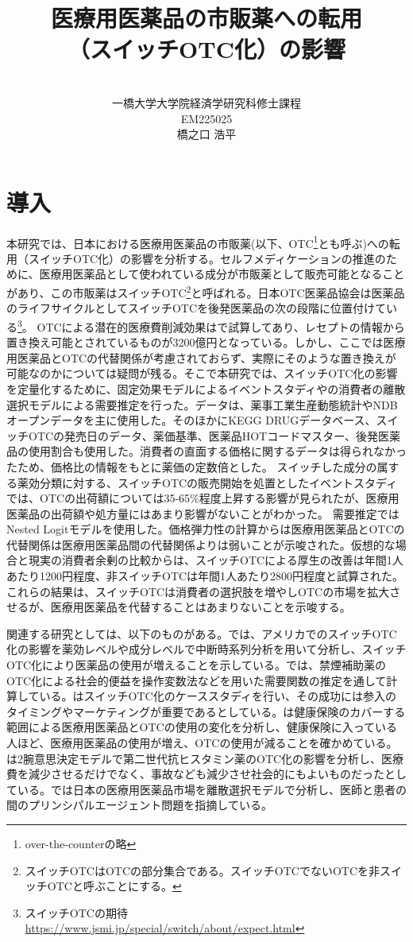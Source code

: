 \documentclass[a4paper,11pt,uplatex]{jsarticle}
\title{\huge 医療用医薬品の市販薬への転用\\（スイッチOTC化）の影響}
\author{\vspace{14cm}\\
一橋大学大学院経済学研究科修士課程\\
EM225025\\
橋之口 浩平}
\date{}
\theoremstyle{definition}
\begin{document}
\thispagestyle{empty}
\maketitle{}
\setcounter{page}{1}
\section{導入}
本研究では、日本における医療用医薬品の市販薬(以下、OTC\footnote{over-the-counterの略}とも呼ぶ)への転用（スイッチOTC化）の影響を分析する。セルフメディケーションの推進のために、医療用医薬品として使われている成分が市販薬として販売可能となることがあり、この市販薬はスイッチOTC\footnote{スイッチOTCはOTCの部分集合である。スイッチOTCでないOTCを非スイッチOTCと呼ぶことにする。}と呼ばれる。日本OTC医薬品協会は医薬品のライフサイクルとしてスイッチOTCを後発医薬品の次の段階に位置付けている\footnote{スイッチOTCの期待\url{https://www.jsmi.jp/special/switch/about/expect.html}}。
OTCによる潜在的医療費削減効果は\cite{igarashi2021}で試算してあり、レセプトの情報から置き換え可能とされているものが3200億円となっている。しかし、ここでは医療用医薬品とOTCの代替関係が考慮されておらず、実際にそのような置き換えが可能なのかについては疑問が残る。そこで本研究では、スイッチOTC化の影響を定量化するために、固定効果モデルによるイベントスタディや\cite{Berry1994}の消費者の離散選択モデルによる需要推定を行った。データは、薬事工業生産動態統計やNDBオープンデータを主に使用した。そのほかにKEGG DRUGデータベース、スイッチOTCの発売日のデータ、薬価基準、医薬品HOTコードマスター、後発医薬品の使用割合も使用した。消費者の直面する価格に関するデータは得られなかったため、価格比の情報をもとに薬価の定数倍とした。
スイッチした成分の属する薬効分類に対する、スイッチOTCの販売開始を処置としたイベントスタディでは、OTCの出荷額については35-65\%程度上昇する影響が見られたが、医療用医薬品の出荷額や処方量にはあまり影響がないことがわかった。
需要推定ではNested Logitモデルを使用した。価格弾力性の計算からは医療用医薬品とOTCの代替関係は医療用医薬品間の代替関係よりは弱いことが示唆された。仮想的な場合と現実の消費者余剰の比較からは、スイッチOTCによる厚生の改善は年間1人あたり1200円程度、非スイッチOTCは年間1人あたり2800円程度と試算された。これらの結果は、スイッチOTCは消費者の選択肢を増やしOTCの市場を拡大させるが、医療用医薬品を代替することはあまりないことを示唆する。

関連する研究としては、以下のものがある。\cite{Stomberg2013}では、アメリカでのスイッチOTC化の影響を薬効レベルや成分レベルで中断時系列分析を用いて分析し、スイッチOTC化により医薬品の使用が増えることを示している。\cite{Keeler2002}では、禁煙補助薬のOTC化による社会的便益を操作変数法などを用いた需要関数の推定を通して計算している。\cite{Mahecha2006}はスイッチOTC化のケーススタディを行い、その成功には参入のタイミングやマーケティングが重要であるとしている。\cite{medicare1995}は健康保険のカバーする範囲による医療用医薬品とOTCの使用の変化を分析し、健康保険に入っている人ほど、医療用医薬品の使用が増え、OTCの使用が減ることを確かめている。\cite{medicare2003}は2腕意思決定モデルで第二世代抗ヒスタミン薬のOTC化の影響を分析し、医療費を減少させるだけでなく、事故なども減少させ社会的にもよいものだったとしている。\cite{Iizuka2007}では日本の医療用医薬品市場を離散選択モデルで分析し、医師と患者の間のプリンシパルエージェント問題を指摘している。
\end{document}
